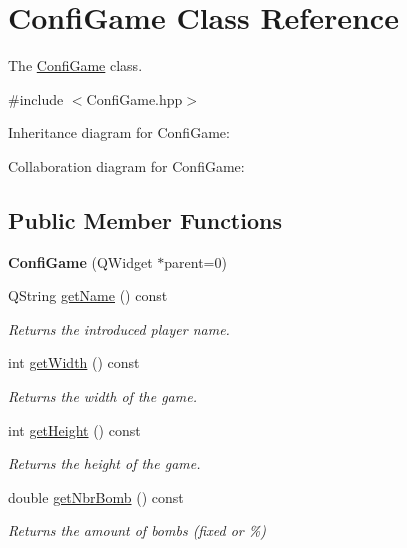 \hypertarget{class_confi_game}{}\section{Confi\+Game Class Reference}
\label{class_confi_game}


The \hyperlink{class_confi_game}{Confi\+Game} class.  




{\ttfamily \#include $<$Confi\+Game.\+hpp$>$}



Inheritance diagram for Confi\+Game\+:


Collaboration diagram for Confi\+Game\+:
\subsection*{Public Member Functions}
\begin{DoxyCompactItemize}
\item 
\mbox{\label{class_confi_game_acd9013d8000d7737fa8c587470796c67}} 
{\bfseries Confi\+Game} (Q\+Widget $\ast$parent=0)
\item 
Q\+String \hyperlink{class_confi_game_ad9c654732a5eb1871775f2c55e5cb7ed}{get\+Name} () const
\begin{DoxyCompactList}\small\item\em Returns the introduced player name. \end{DoxyCompactList}\item 
int \hyperlink{class_confi_game_ad54870fe45e47de1fb27305f4db48142}{get\+Width} () const
\begin{DoxyCompactList}\small\item\em Returns the width of the game. \end{DoxyCompactList}\item 
int \hyperlink{class_confi_game_a00c3fbb4b7eac1ef88ccb78d2b7e6340}{get\+Height} () const
\begin{DoxyCompactList}\small\item\em Returns the height of the game. \end{DoxyCompactList}\item 
double \hyperlink{class_confi_game_a346b36c4a1a7016414dbac08ac401c8e}{get\+Nbr\+Bomb} () const
\begin{DoxyCompactList}\small\item\em Returns the amount of bombs (fixed or \%) \end{DoxyCompactList}\end{DoxyCompactItemize}


